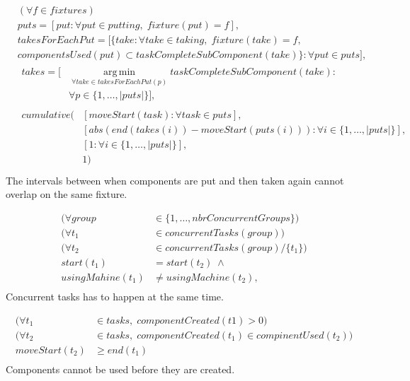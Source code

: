 \documentclass[10pt,a4paper]{report}
\begin{document}
\begin{equation}
\begin{aligned}\label{eq:100}
&(\forall f \in fixtures) \\
&puts = [put : \forall put \in putting, \; fixture(put) = f], \\
&takesForEachPut = [\{take : \forall take \in taking, \; fixture(take) = f, \\
&componentsUsed(put) \subset taskCompleteSubComponent(take)\} : \forall put \in puts], \\
&\begin{aligned}
takes = [&\operatorname*{arg\,min}_{\forall take \in takesForEachPut(p)}{taskCompleteSubComponent(take)} : \\
&\forall p \in \{1 , \ldots , |puts|\}], 
\end{aligned}\\
&\begin{aligned}
cumulative(&[moveStart(task) : \forall task \in puts], \\ &[abs(end(takes(i))-moveStart(puts(i))) : \forall i \in \{1 , \ldots , |puts|\}], \\
&[1 : \forall i \in \{1 , \ldots , |puts|\}],\\
&1)
\end{aligned}\\
\end{aligned}
\end{equation}
The intervals between when components are put and then taken again cannot overlap on the same fixture.

\begin{equation}
\begin{aligned}\label{eq:101}
(\forall group &\in \{1 , \ldots , nbrConcurrentGroups\}) \\
(\forall t_1 &\in concurrentTasks(group)) \\
(\forall t_2 &\in concurrentTasks(group) / \{t_1\}) \\
start(t_1) &= start(t_2) \; \land \\
usingMahine(t_1) &\neq usingMachine(t_2), \\
\end{aligned}
\end{equation}
Concurrent tasks has to happen at the same time.

\begin{equation}
\begin{aligned}\label{eq:102}
(\forall t_1 &\in tasks, \; componentCreated(t1) > 0) \\
(\forall t_2 &\in tasks, \; componentCreated(t_1) \in compinentUsed(t_2)) \\
moveStart(t_2) &\geq end(t_1) \\
\end{aligned}
\end{equation}
Components cannot be used before they are created.
\end{document}
